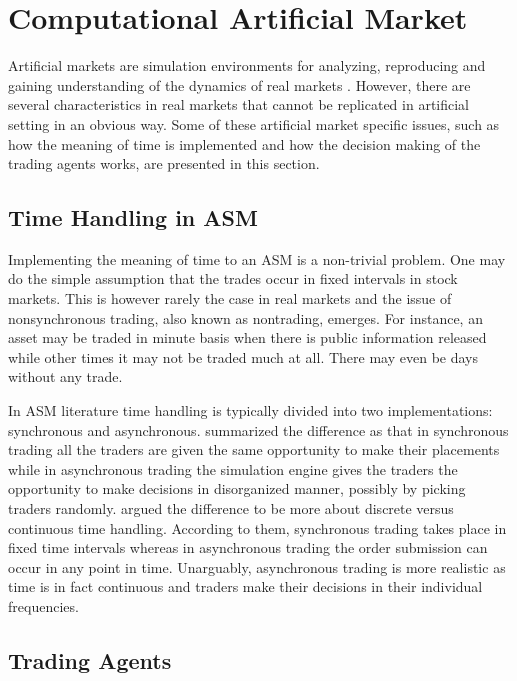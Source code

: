 \section{Computational Artificial Market}
Artificial markets are simulation environments for analyzing, 
reproducing and gaining understanding of the dynamics of 
real markets \citep{Julien07}. However, there are several 
characteristics in real markets that cannot be replicated
in artificial setting in an obvious way. Some of these artificial
market specific issues, such as how the meaning of time is 
implemented and how the decision making of the trading agents
works, are presented in this section.


\subsection{Time Handling in ASM}

Implementing the meaning of time to an ASM is a non-trivial problem.
One may do the simple assumption that the trades occur in fixed
intervals in stock markets. This is however rarely the case in real markets
and the issue of nonsynchronous trading, also known as nontrading, emerges. 
For instance, an asset may be traded in minute basis when there is
public information released while other times it may not be traded much at all.
There may even be days without any trade. \citep{Econometrics} 

In ASM literature time handling is typically divided into two implementations:
synchronous and asynchronous. \citet{Julien07} summarized the difference as that in synchronous
trading all the traders are given the same opportunity to make their placements
while in asynchronous trading the simulation engine gives the traders the opportunity to
make decisions in disorganized manner, possibly by picking traders randomly.
\citet{Ben17} argued the difference to be more about discrete versus continuous time handling.
According to them, synchronous trading takes place in fixed time intervals whereas in 
asynchronous trading the order submission can occur in any point in time. Unarguably, 
asynchronous trading is more realistic as time is in fact continuous and traders make
their decisions in their individual frequencies.


\subsection{Trading Agents}
\label{section:ASMTradingAgents}

